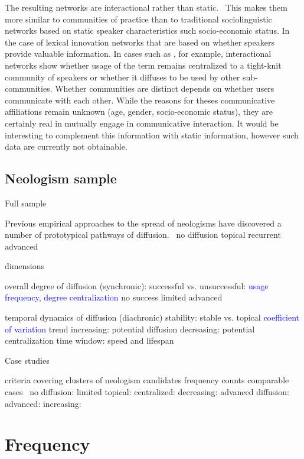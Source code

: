 \documentclass[draft, a4paper, abstract=on]{scrartcl}
\newcommand{\mtrc}[1]{\textcolor{blue}{#1}}
\begin{document}
  The resulting networks are interactional rather than static.~\parencite{Goel2016SocialDynamics} This makes them more similar to communities of practice than to traditional sociolinguistic networks based on static speaker characteristics such socio-economic status.
  In the case of lexical innovation networks that are based on whether speakers provide valuable information. In cases such as , for example, interactional networks show whether usage of the term remains centralized to a tight-knit community of speakers or whether it diffuses to be used by other sub-communities.
  Whether communities are distinct depends on whether users communicate with each other. While the reasons for theses communicative affiliations remain unknown (age, gender, socio-economic status), they are certainly real in mutually engage in communicative interaction.
  It would be interesting to complement this information with static information, however such data are currently not obtainable.

  \subsection{Neologism sample}

  Full sample

  Previous empirical approaches to the spread of neologisms have discovered a number of prototypical pathways of diffusion.~\parencite{Kerremans2015WebNew}
  no diffusion
  topical
  recurrent
  advanced

  dimensions

  overall degree of diffusion (synchronic): successful vs. unsuccessful: \mtrc{usage frequency}, \mtrc{degree centralization}
  no success
  limited
  advanced

  temporal dynamics of diffusion (diachronic)
  stability: stable vs. topical \mtrc{coefficient of variation}
  trend
  increasing: potential diffusion
  decreasing: potential centralization
  time window: speed and lifespan

  Case studies

  criteria
  covering clusters of neologism candidates
  frequency counts comparable
  cases~\parencite{Kerremans2015WebNew}
  no diffusion: 
  limited
  topical: 
  centralized: 
  decreasing: 
  advanced diffusion:
  advanced: 
  increasing: 

\section{Frequency}
\end{document}
